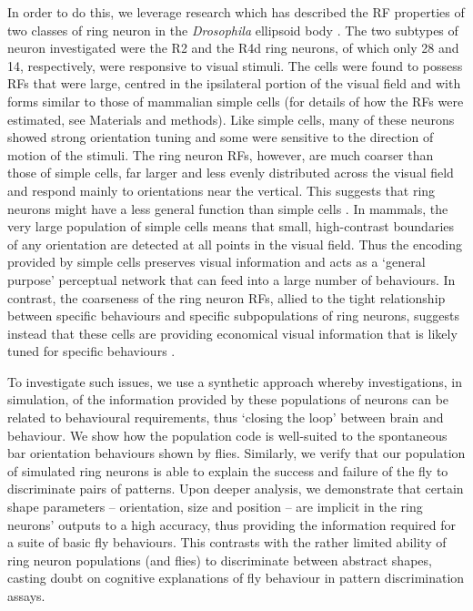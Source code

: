 In order to do this, we leverage research which has described the RF properties of two classes of ring neuron in the \emph{Drosophila} ellipsoid body \cite{Seelig2013}. The two subtypes of neuron investigated were the R2 and the R4d ring neurons, of which only 28 and 14, respectively, were responsive to visual stimuli. The cells were found to possess RFs that were large, centred in the ipsilateral portion of the visual field and with forms similar to those of mammalian simple cells \cite{Hubel1962} (for details of how the RFs were estimated, see Materials and methods). Like simple cells, many of these neurons showed strong orientation tuning and some were sensitive to the direction of motion of the stimuli. The ring neuron RFs, however, are much coarser than those of simple cells, far larger and less evenly distributed across the visual field and respond mainly to orientations near the vertical. This suggests that ring neurons might have a less general function than simple cells \cite{Wystrach2014}. In mammals, the very large population of simple cells means that small, high-contrast boundaries of any orientation are detected at all points in the visual field. Thus the encoding provided by simple cells preserves visual information and acts as a `general purpose' perceptual network that can feed into a large number of behaviours. In contrast, the coarseness of the ring neuron RFs, allied to the tight relationship between specific behaviours and specific subpopulations of ring neurons, suggests instead that these cells are providing economical visual information that is likely tuned for specific behaviours \cite{Wystrach2014}.

To investigate such issues, we use a synthetic approach whereby investigations, in simulation, of the information provided by these populations of neurons can be related to behavioural requirements, thus `closing the loop' between brain and behaviour. We show how the population code is well-suited to the spontaneous bar orientation behaviours shown by flies. Similarly, we verify that our population of simulated ring neurons is able to explain the success and failure of the fly to discriminate pairs of patterns. Upon deeper analysis, we demonstrate that certain shape parameters -- orientation, size and position -- are implicit in the ring neurons' outputs to a high accuracy, thus providing the information required for a suite of basic fly behaviours. This contrasts with the rather limited ability of ring neuron populations (and flies) to discriminate between abstract shapes, casting doubt on cognitive explanations of fly behaviour in pattern discrimination assays.

